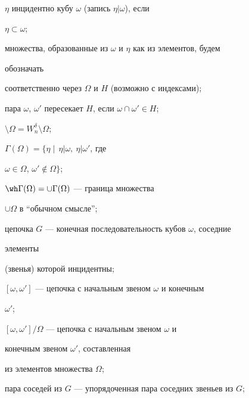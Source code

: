  


$\eta$ инцидентно кубу $\omega$ (запись $\eta|\omega$), если 


$\eta\subset\omega$; 


 


множества, образованные из $\omega$ и $\eta$ как из элементов, будем 


обозначать 


соответственно через $\Omega$ и $H$ (возможно с индексами); 


 


пара $\omega$, $\omega'$ пересекает $H$, если $\omega\cap\omega'\in H$; 


 


$\setminus\Omega=W^\delta_n\setminus\Omega$; 


 


$\Gamma(\Omega)=\{\eta\mid\,\eta|\omega,\ \eta|\omega'$, где 


$\omega\in\Omega$, $\omega'\notin\Omega\}$; 


 


$\wh\Gamma(\Omega)=\cup\Gamma(\Omega)$ --- граница множества 


$\cup\Omega$ в ``обычном смысле''; 


 


цепочка $G$ --- конечная последовательность кубов $\omega$, соседние 


элементы 


(звенья) которой инцидентны; 


 


$[\omega,\omega']$ --- цепочка с начальным звеном $\omega$ и конечным 


$\omega'$; 


 


$[\omega,\omega']/\Omega$ --- цепочка с начальным звеном $\omega$ и 


конечным звеном $\omega'$, составленная 


из элементов множества $\Omega$; 


 


пара соседей из $G$ --- упорядоченная пара соседних звеньев из $G$; 


